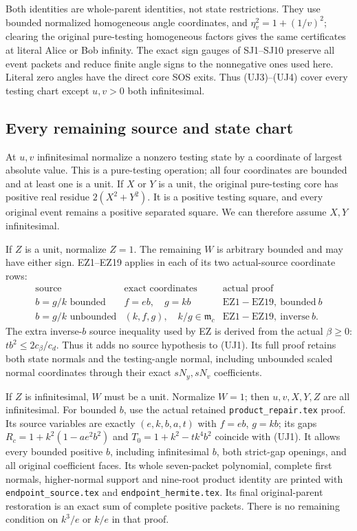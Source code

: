 Both identities are whole-parent identities, not state
restrictions. They use bounded normalized homogeneous angle
coordinates, and $\eta_v^2=1+(1/v)^2$; clearing the original
pure-testing homogeneous factors gives the same certificates
at literal Alice or Bob infinity. The exact sign gauges of
SJ1--SJ10 preserve all event packets and reduce finite angle
signs to the nonnegative ones used here. Literal zero angles
have the direct core SOS exits. Thus (UJ3)--(UJ4) cover every
testing chart except $u,v>0$ both infinitesimal.

\subsection{Every remaining source and state chart}

At $u,v$ infinitesimal normalize a nonzero testing state by a
coordinate of largest absolute value. This is a pure-testing
operation; all four coordinates are bounded and at least one
is a unit. If $X$ or $Y$ is a unit, the original pure-testing
core has positive real residue $2(X^2+Y^2)$. It is a positive
testing square, and every original event remains a positive
separated square. We can therefore assume $X,Y$ infinitesimal.

If $Z$ is a unit, normalize $Z=1$. The remaining $W$ is arbitrary
bounded and may have either sign. EZ1--EZ19 applies in each of
its two actual-source coordinate rows:
\[
\begin{array}{c|c|c}
 \text{source}&\text{exact coordinates}&\text{actual proof}\\ \hline
 b=g/k\text{ bounded}& f=eb,\quad g=kb&
                     \mathrm{EZ1\!-\!EZ19,\ bounded\ }b\\
 b=g/k\text{ unbounded}&
        (k,f,g),\quad k/g\in\mathfrak m_c&
                     \mathrm{EZ1\!-\!EZ19,\ inverse\ }b.
\end{array}                                                     \tag{UJ5}
\]
The extra inverse-$b$ source inequality used by EZ is derived from
the actual $\beta\geq0$: $tb^2\leq2c_\beta/c_d$. Thus it adds no
source hypothesis to (UJ1). Its full proof retains both state
normals and the testing-angle normal, including unbounded scaled
normal coordinates through their exact $sN_y,sN_v$ coefficients.

If $Z$ is infinitesimal, $W$ must be a unit. Normalize $W=1$;
then $u,v,X,Y,Z$ are all infinitesimal.
For bounded $b$, use the actual retained
\texttt{product\_repair.tex} proof. Its source variables are exactly
$(e,k,b,a,t)$ with $f=eb$, $g=kb$; its gaps
$R_c=1+k^2(1-ae^2b^2)$ and
$T_0=1+k^2-tk^4b^2$ coincide with (UJ1).
It allows every bounded positive $b$, including infinitesimal $b$,
both strict-gap openings, and all original coefficient faces.
Its whole seven-packet polynomial, complete first normals,
higher-normal support and nine-root product identity are printed
with \texttt{endpoint\_source.tex} and
\texttt{endpoint\_hermite.tex}. Its final original-parent
restoration is an exact sum of complete positive packets.
There is no remaining condition on $k^3/e$ or $k/e$ in that proof.

